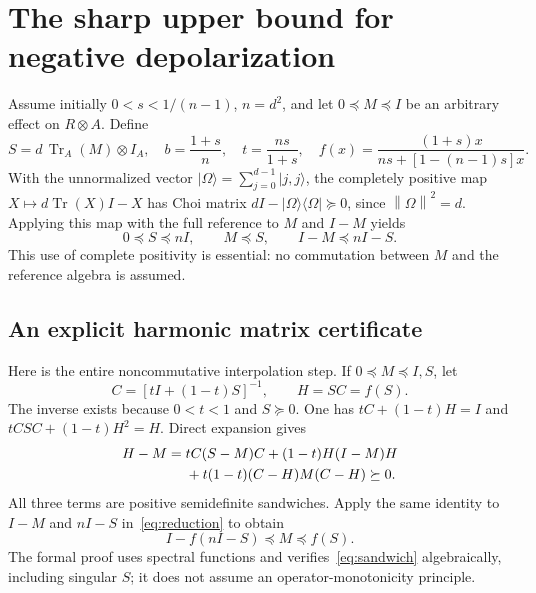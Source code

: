 \documentclass[11pt,a4paper]{article}
\newcommand{\Tr}{\operatorname{Tr}}
\newcommand{\norm}[1]{\left\lVert#1\right\rVert}
\newcommand{\ket}[1]{\lvert#1\rangle}
\newcommand{\bra}[1]{\langle#1\rvert}
\newcommand{\psd}{\succeq0}
\begin{document}
\section{The sharp upper bound for negative depolarization}
Assume initially $0<s<1/(n-1)$, $n=d^2$, and let $0\preceq M\preceq I$ be an arbitrary effect on $R\otimes A$. Define
\[
 S=d\,\Tr_A(M)\otimes I_A,\quad
 b=\frac{1+s}{n},\quad t=\frac{ns}{1+s},\quad
 f(x)=\frac{(1+s)x}{ns+[1-(n-1)s]x}.
\]
With the unnormalized vector $\ket\Omega=\sum_{j=0}^{d-1}\ket{j,j}$, the completely positive map $X\mapsto d\Tr(X)I-X$ has Choi matrix
$dI-\ket\Omega\bra\Omega\succeq0$, since $\norm\Omega^2=d$. Applying this map with the full reference to $M$ and $I-M$ yields
\begin{equation}\label{eq:reduction}
 0\preceq S\preceq nI,\qquad M\preceq S,\qquad I-M\preceq nI-S.
\end{equation}
This use of complete positivity is essential: no commutation between $M$ and the reference algebra is assumed.

\subsection{An explicit harmonic matrix certificate}
Here is the entire noncommutative interpolation step. If $0\preceq M\preceq I,S$, let
\[
 C=[tI+(1-t)S]^{-1},\qquad H=SC=f(S).
\]
The inverse exists because $0<t<1$ and $S\psd$. One has
$tC+(1-t)H=I$ and $tCSC+(1-t)H^2=H$. Direct expansion gives
\begin{align}\label{eq:sandwich}
 H-M={}&tC(S-M)C+(1-t)H(I-M)H\notag\\
 &+t(1-t)(C-H)M(C-H)\succeq0.
\end{align}
All three terms are positive semidefinite sandwiches. Apply the same identity to $I-M$ and $nI-S$ in~\eqref{eq:reduction} to obtain
\[
 I-f(nI-S)\preceq M\preceq f(S).
\]
The formal proof uses spectral functions and verifies~\eqref{eq:sandwich} algebraically, including singular $S$; it does not assume an operator-monotonicity principle.
\end{document}
